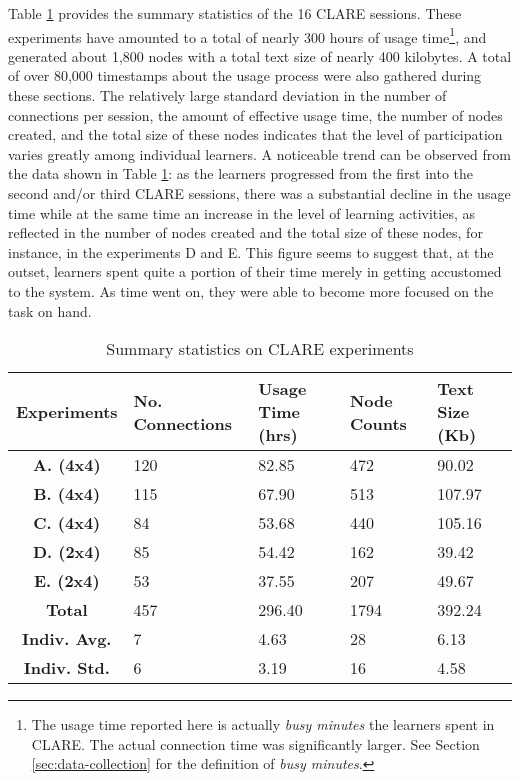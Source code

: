 Table \ref{tab:summary-stat} provides the summary statistics of the 16
CLARE sessions. These experiments have amounted to a total of nearly 300
hours of usage time\footnote{The usage time reported here is actually {\it busy
minutes\/} the learners spent in CLARE. The actual connection time was
significantly larger. See Section \ref{sec:data-collection} for the
definition of {\it busy minutes\/}.}, and generated about 1,800 nodes with
a total text size of nearly 400 kilobytes. A total of over 80,000
timestamps about the usage process were also gathered during these
sections.  The relatively large standard deviation in the number of
connections per session, the amount of effective usage time, the number of
nodes created, and the total size of these nodes indicates that the level
of participation varies greatly among individual learners. A noticeable
trend can be observed from the data shown in Table \ref{tab:summary-stat}:
as the learners progressed from the first into the second and/or third
CLARE sessions, there was a substantial decline in the usage time while at
the same time an increase in the level of learning activities, as reflected
in the number of nodes created and the total size of these nodes, for
instance, in the experiments D and E.  This figure seems to suggest that,
at the outset, learners spent quite a portion of their time merely in
getting accustomed to the system. As time went on, they were able to become
more focused on the task on hand.

\small
\begin{table}[hbtp]
    \caption{Summary statistics on CLARE experiments}
    \begin{center}
    \begin{tabular} {||c|p{0.8in}|p{0.8in}|p{0.8in}|p{0.8in}||} \hline   
    {\bf Experiments} &   {\bf No. Connections} & {\bf Usage Time (hrs)}&  {\bf
    Node Counts} & {\bf Text Size (Kb)} \\ \hline \hline 
    {\bf A.  (4x4)}    &   120 &   82.85   &   472   & 90.02 \\ \hline
    {\bf B.  (4x4)}    &   115 &    67.90 &     513 &  107.97 \\ \hline
    {\bf C.  (4x4)}    &   84 &    53.68  &    440  & 105.16 \\ \hline \hline
    {\bf D.  (2x4)}    &   85 &    54.42  &    162  &  39.42 \\ \hline
    {\bf E.  (2x4)}    &   53  &   37.55   &   207   & 49.67 \\ \hline  \hline
    {\bf Total}        &   457  &  296.40   &  1794   & 392.24 \\ \hline  \hline
    {\bf Indiv. Avg.}  &   7   &  4.63  &     28   &   6.13 \\ \hline  \hline
    {\bf Indiv. Std.}  &   6   &  3.19  &     16   &   4.58 \\ \hline
    \end{tabular}
    \end{center}    
    \label{tab:summary-stat}
\end{table}
\normalsize
{}

